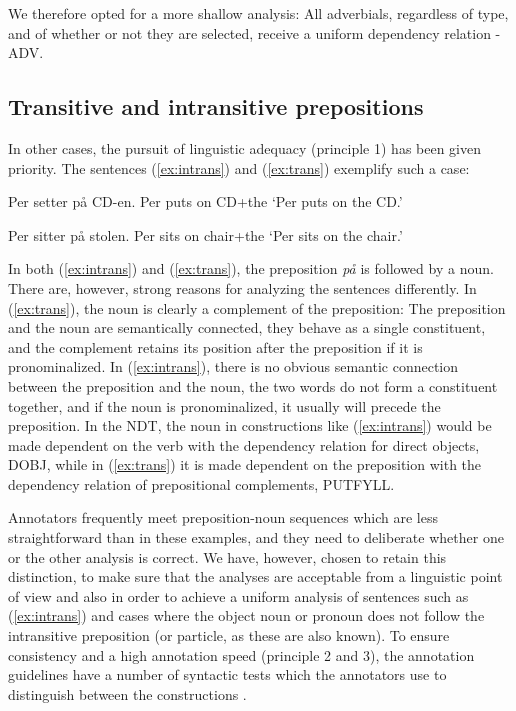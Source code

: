\documentclass[11pt,a4paper]{article}
\begin{document}
We therefore opted for a more shallow analysis:
All adverbials, regardless of type,
and of whether or not they are selected,
receive a uniform dependency relation - ADV. 

\subsection{Transitive and intransitive prepositions}
In other cases, the pursuit of linguistic adequacy (principle 1) has been given priority. The sentences (\ref{ex:intrans}) and (\ref{ex:trans}) exemplify such a case:

\begin{examples}
\item\label{ex:intrans}
\gll Per setter på CD-en.
Per puts on CD+the
\glt `Per puts on the CD.'
\glend

\item\label{ex:trans}
\gll Per sitter på stolen.
Per sits on chair+the
\glt `Per sits on the chair.'
\glend
\end{examples}

In both (\ref{ex:intrans}) and (\ref{ex:trans}), the preposition \emph{på} is followed by a noun. There are, however, strong reasons for analyzing the sentences differently. In (\ref{ex:trans}), the noun is clearly a complement of the preposition: The preposition and the noun are semantically connected, they behave as a single constituent, and the complement retains its position after the preposition if it is pronominalized. In (\ref{ex:intrans}), there is no obvious semantic connection between the preposition and the noun, the two words do not form a constituent together, and if the noun is pronominalized, it usually will precede the preposition. In the NDT, the noun in constructions like (\ref{ex:intrans}) would be made dependent on the verb with the dependency relation for direct objects, DOBJ, while in (\ref{ex:trans}) it is made dependent on the preposition with the dependency relation of prepositional complements, PUTFYLL.

Annotators frequently meet preposition-noun sequences which are less straightforward than in these examples, and they need to deliberate whether one or the other analysis is correct. We have, however, chosen to retain this distinction, to make sure that the analyses are acceptable from a linguistic point of view and also in order to achieve a uniform analysis of sentences such as (\ref{ex:intrans}) and cases where the object noun or pronoun does not follow the intransitive preposition (or particle, as these are also known). To ensure consistency and a high annotation speed (principle 2 and 3), the annotation guidelines have a number of syntactic tests which the annotators use to distinguish between the constructions \cite[54-56]{Kin:Sol:Eri:2013}.
\end{document}

